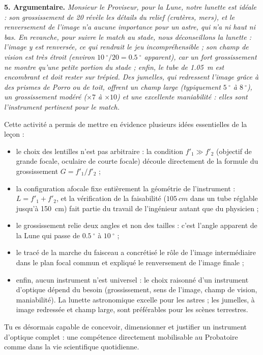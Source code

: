 \documentclass[11pt]{article}
\providecommand{\degree}{^{\circ}}
\newcommand{\cle}[1]{{\popxbold\color{popdark}#1}}
\newcounter{popsec}
\newcounter{popsub}
\newcommand{\courssub}[1]{%
  \stepcounter{popsub}%
  \par\vspace{9pt}\noindent{\popxbold\fontsize{11.5}{13}\selectfont\color{popink}{\color{poporange}\thepopsec.\thepopsub}\hspace{6pt}#1}\par\nopagebreak\vspace{4pt}
}
\begin{document}
\begin{exoresolu}
\textbf{5. Argumentaire.} \emph{Monsieur le Proviseur, pour la Lune, notre lunette est idéale : son grossissement de 20 révèle les détails du relief (cratères, mers), et le renversement de l'image n'a aucune importance pour un astre, qui n'a ni haut ni bas. En revanche, pour suivre le match au stade, nous déconseillons la lunette : l'image y est renversée, ce qui rendrait le jeu incompréhensible ; son champ de vision est très étroit (environ $\SI{10}{\degree}/20 = \SI{0,5}{\degree}$ apparent), car un fort grossissement ne montre qu'une petite portion du stade ; enfin, le tube de \SI{1,05}{m} est encombrant et doit rester sur trépied. Des jumelles, qui redressent l'image grâce à des prismes de Porro ou de toit, offrent un champ large (typiquement $\SI{5}{\degree}$ à $\SI{8}{\degree}$), un grossissement modéré ($\times 7$ à $\times 10$) et une excellente maniabilité : elles sont l'instrument pertinent pour le match.}
\end{exoresolu}

\courssub{Bilan de l'activité}

\begin{aretenir}
Cette activité a permis de mettre en évidence plusieurs idées essentielles de la leçon :
\begin{itemize}
\item le \cle{choix des lentilles} n'est pas arbitraire : la condition $f'_1 \gg f'_2$ (objectif de grande focale, oculaire de courte focale) découle directement de la formule du grossissement $G = f'_1/f'_2$ ;
\item la \cle{configuration afocale} fixe entièrement la géométrie de l'instrument : $L = f'_1 + f'_2$, et la vérification de la faisabilité ($\SI{105}{cm}$ dans un tube réglable jusqu'à \SI{150}{cm}) fait partie du travail de l'ingénieur autant que du physicien ;
\item le grossissement relie deux \cle{angles} et non des tailles : c'est l'angle apparent de la Lune qui passe de $\SI{0,5}{\degree}$ à $\SI{10}{\degree}$ ;
\item le tracé de la marche du faisceau a concrétisé le rôle de l'\cle{image intermédiaire} dans le plan focal commun et expliqué le \cle{renversement} de l'image finale ;
\item enfin, aucun instrument n'est universel : le \cle{choix raisonné} d'un instrument d'optique dépend du besoin (grossissement, sens de l'image, champ de vision, maniabilité). La lunette astronomique excelle pour les astres ; les jumelles, à image redressée et champ large, sont préférables pour les scènes terrestres.
\end{itemize}
Tu es désormais capable de concevoir, dimensionner et justifier un instrument d'optique complet : une compétence directement mobilisable au Probatoire comme dans la vie scientifique quotidienne.
\end{aretenir}
\end{document}
